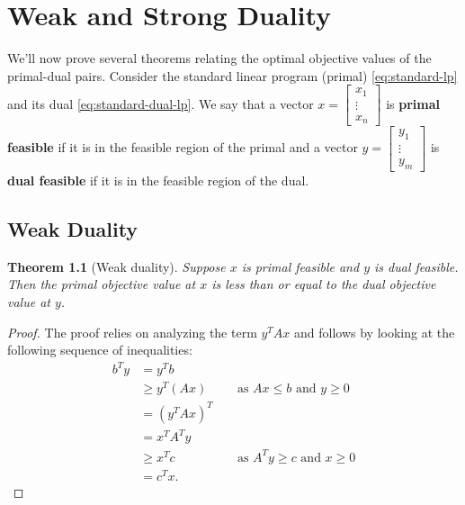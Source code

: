 \documentclass[
]{book}
\newtheorem{theorem}{Theorem}[chapter]
\theoremstyle{definition}
\theoremstyle{definition}
\theoremstyle{definition}
\theoremstyle{definition}
\theoremstyle{remark}
\begin{document}
\hypertarget{weak-and-strong-duality}{%
\chapter{Weak and Strong Duality}\label{weak-and-strong-duality}}

We'll now prove several theorems relating the optimal objective values of the primal-dual pairs.
Consider the standard linear program (primal) \eqref{eq:standard-lp} and its dual \eqref{eq:standard-dual-lp}.
We say that a vector \(x = \begin{bmatrix} x_1 \\ \vdots \\ x_n \end{bmatrix}\) is \textbf{primal feasible} if it is in the feasible region of the primal and a vector \(y = \begin{bmatrix} y_1 \\ \vdots \\ y_m \end{bmatrix}\) is \textbf{dual feasible} if it is in the feasible region of the dual.

\hypertarget{weak-duality}{%
\section{Weak Duality}\label{weak-duality}}

\begin{theorem}[Weak duality]
\protect\hypertarget{thm:weak-duality}{}\label{thm:weak-duality}Suppose \(x\) is primal feasible and \(y\) is dual feasible. Then the primal objective value at \(x\) is less than or equal to the dual objective value at \(y\).
\end{theorem}

\begin{proof}
The proof relies on analyzing the term \(y^T A x\) and follows by looking at the following sequence of inequalities:
\begin{align*} 
b^T y 
  & = y^T b \\
  & \ge y^T (Ax) && \mbox{ as } Ax \leq b \mbox{ and } y \geq 0 \\
  & = (y^T A x)^T \\
  & = x^T A^T y \\ 
  & \ge x^T c && \mbox{ as } A^Ty \geq c \mbox{ and } x \geq 0 \\
  & = c^T x.
\end{align*}
\end{proof}
\end{document}
